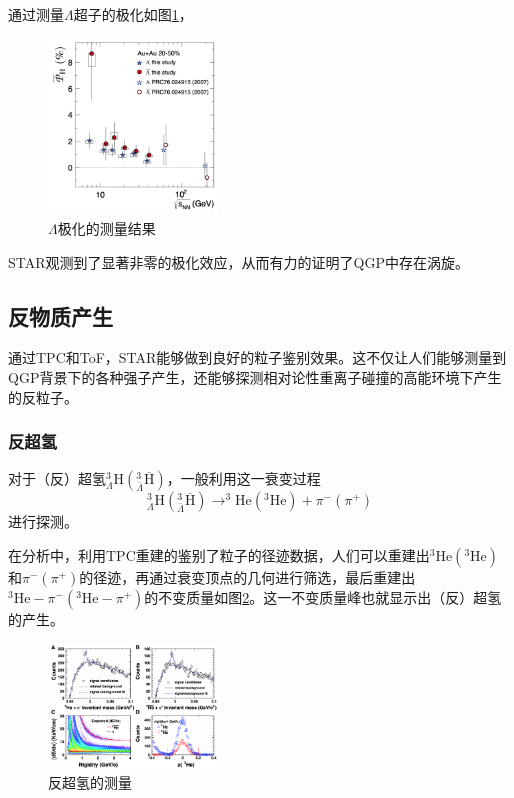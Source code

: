 \documentclass[%
 reprint,
 amsmath,amssymb,
 aps,
]{revtex4-1}
\begin{document}
\begin{description}
    通过测量$\Lambda$超子的极化\cite{STAR:2017ckg}如图\ref{fig:Lambda}，
    \begin{figure}[htbp]
        \includegraphics[width=0.4\textwidth]{Plots/Lambda.png}
        \caption{\label{fig:Lambda}$\Lambda$极化的测量结果}
    \end{figure} 
    STAR观测到了显著非零的极化效应，从而有力的证明了QGP中存在涡旋。
\end{description}
\subsection{\label{sec:antimatter}反物质产生}
通过TPC和ToF，STAR能够做到良好的粒子鉴别效果。这不仅让人们能够测量到QGP背景下的各种强子产生，还能够探测相对论性重离子碰撞的高能环境下产生的反粒子。
\subsubsection{\label{sec:antihypertritons}反超氢}
对于（反）超氢$^3_\Lambda \text{H}(^3_{\bar\Lambda} \overline{\text{H}})$，一般利用这一衰变过程
\begin{equation}
    ^3_\Lambda \text{H}(^3_{\bar\Lambda} \overline{\text{H}}) \to  ^3\text{He}(^3\text{He})+\pi^-(\pi^+)
\end{equation}
进行探测。

在分析\cite{Abelev:2010rv}中，利用TPC重建的鉴别了粒子的径迹数据，人们可以重建出$^3\text{He}(^3\text{He})$和$\pi^-(\pi^+)$的径迹，再通过衰变顶点的几何进行筛选，最后重建出$^3\text{He}-\pi^-(^3\text{He}-\pi^+)$的不变质量如图\ref{fig:Hyperon}。这一不变质量峰也就显示出（反）超氢的产生。
\begin{figure}[htbp]
    \includegraphics[width=0.4\textwidth]{Plots/Hyperon.png}
    \caption{\label{fig:Hyperon}反超氢的测量}
\end{figure}
\end{document}
